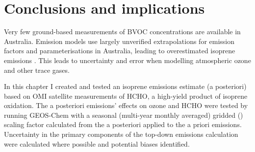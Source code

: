       
    
    
\section{Conclusions and implications}
  \label{BioIsop:conclusions}
  
  
  
  Very few ground-based measurements of BVOC concentrations are available in Australia.
  Emission models use largely unverified extrapolations for emission factors and parameterisations in Australia, leading to overestimated isoprene emissions \parencite{Emmerson2016}.
  This leads to uncertainty and error when modelling atmospheric ozone and other trace gases.
  
  In this chapter I created and tested an isoprene emissions estimate (a posteriori) based on OMI satellite measurements of HCHO, a high-yield product of isoprene oxidation.
  The a posteriori emissions' effects on ozone and HCHO were tested by running GEOS-Chem with a seasonal (multi-year monthly averaged) gridded (\lowhr) scaling factor calculated from the a posteriori applied to the a priori emissions.
  Uncertainty in the primary components of the top-down emissions calculation were calculated where possible and potential biases identified.
  

